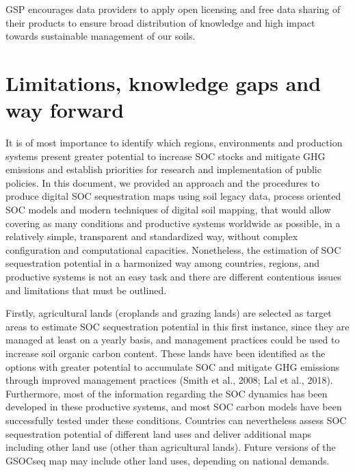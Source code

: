 \documentclass[
  10pt,
  b5paper,
]{book}
\begin{document}
GSP encourages data providers to apply open licensing and free data sharing of their products to ensure broad distribution of knowledge and high impact towards sustainable management of our soils.

\hypertarget{limitations-knowledge-gaps-and-way-forward}{%
\chapter{\textbar{} Limitations, knowledge gaps and way forward}\label{limitations-knowledge-gaps-and-way-forward}}

It is of most importance to identify which regions, environments and production systems present greater potential to increase SOC stocks and mitigate GHG emissions and establish priorities for research and implementation of public policies. In this document, we provided an approach and the procedures to produce digital SOC sequestration maps using soil legacy data, process oriented SOC models and modern techniques of digital soil mapping, that would allow covering as many conditions and productive systems worldwide as possible, in a relatively simple, transparent and standardized way, without complex configuration and computational capacities. Nonetheless, the estimation of SOC sequestration potential in a harmonized way among countries, regions, and productive systems is not an easy task and there are different contentious issues and limitations that must be outlined.

Firstly, agricultural lands (croplands and grazing lands) are selected as target areas to estimate SOC sequestration potential in this first instance, since they are managed at least on a yearly basis, and management practices could be used to increase soil organic carbon content. These lands have been identified as the options with greater potential to accumulate SOC and mitigate GHG emissions through improved management practices (Smith et al., 2008; Lal et al., 2018). Furthermore, most of the information regarding the SOC dynamics has been developed in these productive systems, and most SOC carbon models have been successfully tested under these conditions. Countries can nevertheless assess SOC sequestration potential of different land uses and deliver additional maps including other land use (other than agricultural lands). Future versions of the GSOCseq map may include other land uses, depending on national demands.
\end{document}
